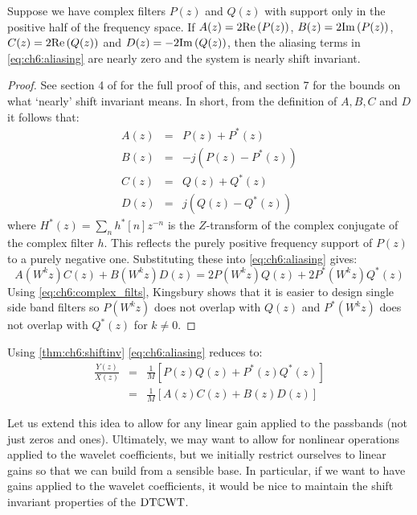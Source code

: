 \begin{theorem} \label{thm:ch6:shiftinv}
  Suppose we have complex filters $P(z)$ and $Q(z)$ with support only in the
  positive half of the frequency space. If $A(z) = 2\mathrm{Re}\left(P(z)\right)$, $B(z) =
  2\mathrm{Im}\left(P(z)\right)$, $C(z) = 2\mathrm{Re}\left(Q(z)\right)$ and $D(z) = -2\mathrm{Im}\left(Q(z)\right)$, then the aliasing
  terms in \eqref{eq:ch6:aliasing} are nearly zero and the system is nearly
  shift invariant.
\end{theorem}

\begin{proof}
  See section 4 of \cite{kingsbury_complex_2001} for the full proof of
  this, and section 7 for the bounds on what `nearly' shift invariant means. 
  In short, from the definition of $A, B, C$ and $D$ it follows that:  
  \begin{eqnarray*}
    A(z) &=& P(z) + P^*(z) \\
    B(z) &=& -j(P(z) - P^*(z)) \\
    C(z) &=& Q(z) + Q^*(z) \\
    D(z) &=& j(Q(z) - Q^*(z))
  \end{eqnarray*}
  where $H^*(z) = \sum_n h^*[n]z^{-n}$ is the $Z$-transform of the complex
  conjugate of the complex filter $h$. This reflects the purely positive
  frequency support of $P(z)$ to a purely negative one. Substituting these into
  \eqref{eq:ch6:aliasing} gives:
  \begin{equation}
    A(W^k z)C(z) + B(W^k z)D(z) = 2P(W^kz)Q(z) + 2P^*(W^kz)Q^*(z)
    \label{eq:ch6:complex_filts}
  \end{equation}
 Using \eqref{eq:ch6:complex_filts}, Kingsbury shows that it is easier to design
 single side band filters so $P(W^kz)$ does not overlap with $Q(z)$ and
 $P^*(W^kz)$ does not overlap with $Q^*(z)$ for $k \neq 0$.
\end{proof}

Using \autoref{thm:ch6:shiftinv} \eqref{eq:ch6:aliasing} reduces to:
\begin{eqnarray}
  \frac{Y(z)}{X(z)} & = & \frac{1}{M}\left[ P(z)Q(z) + P^*(z)Q^*(z) \right]
  \label{eq:ch6:aliasing_cancel2} \\
    &=& \frac{1}{M}\left[ A(z)C(z) + B(z)D(z) \right]
  \label{eq:ch6:aliasing_cancel} 
\end{eqnarray}

Let us extend this idea to allow for any linear gain applied to the passbands
(not just zeros and ones). Ultimately, we may want to allow for nonlinear
operations applied to the wavelet coefficients, but we initially restrict
ourselves to linear gains so that we can build from a sensible base. In
particular, if we want to have gains applied to the wavelet coefficients, it
would be nice to maintain the shift invariant properties of the $\mathrm{DT}\mathbb{C}\mathrm{WT}$.

